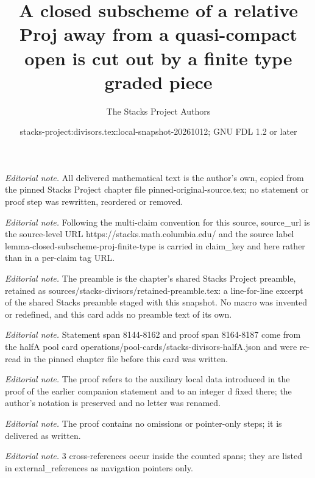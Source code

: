 \documentclass[10pt,a4paper]{amsart}
\title{A closed subscheme of a relative Proj away from a quasi-compact open is cut out by a finite type graded piece}
\author{The Stacks Project Authors}
\date{stacks-project:divisors.tex:local-snapshot-20261012; GNU FDL 1.2 or later}
\theoremstyle{plain}
\theoremstyle{definition}
\theoremstyle{remark}
\numberwithin{equation}{subsection}
\begin{document}
\maketitle
\noindent\textit{Editorial note.} All delivered mathematical text is the author's own, copied from the pinned Stacks Project chapter file pinned-original-source.tex; no statement or proof step was rewritten, reordered or removed.\par\medskip
\noindent\textit{Editorial note.} Following the multi-claim convention for this source, source\_url is the source-level URL https://stacks.math.columbia.edu/ and the source label lemma-closed-subscheme-proj-finite-type is carried in claim\_key and here rather than in a per-claim tag URL.\par\medskip
\noindent\textit{Editorial note.} The preamble is the chapter's shared Stacks Project preamble, retained as sources/stacks-divisors/retained-preamble.tex: a line-for-line excerpt of the shared Stacks preamble staged with this snapshot. No macro was invented or redefined, and this card adds no preamble text of its own.\par\medskip
\noindent\textit{Editorial note.} Statement span 8144-8162 and proof span 8164-8187 come from the halfA pool card operations/pool-cards/stacks-divisors-halfA.json and were re-read in the pinned chapter file before this card was written.\par\medskip
\noindent\textit{Editorial note.} The proof refers to the auxiliary local data introduced in the proof of the earlier companion statement and to an integer d fixed there; the author's notation is preserved and no letter was renamed.\par\medskip
\noindent\textit{Editorial note.} The proof contains no omissions or pointer-only steps; it is delivered as written.\par\medskip
\noindent\textit{Editorial note.} 3 cross-references occur inside the counted spans; they are listed in external\_references as navigation pointers only.\par\medskip
\end{document}
